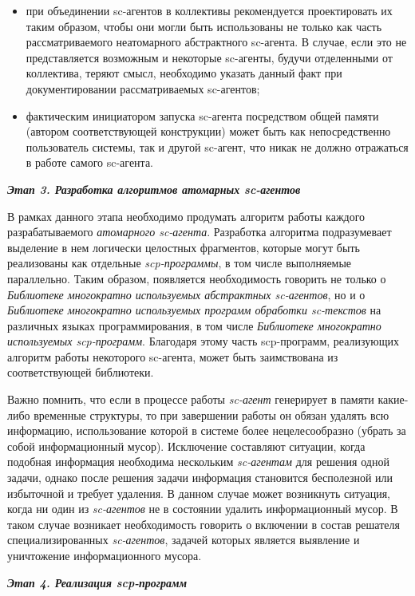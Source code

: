 \begin{itemize}
\item при объединении sc-агентов в коллективы рекомендуется проектировать их таким образом, чтобы они могли быть использованы не только как часть рассматриваемого неатомарного абстрактного sc-агента. В случае, если это не представляется возможным и некоторые sc-агенты, будучи отделенными от коллектива, теряют смысл, необходимо указать данный факт при документировании рассматриваемых sc-агентов;
\item фактическим инициатором запуска sc-агента посредством общей памяти (автором соответствующей конструкции) может быть как непосредственно пользователь системы, так и другой sc-агент, что никак не должно отражаться в работе самого sc-агента.
\end{itemize}

\textbf{\textit{Этап 3. Разработка алгоритмов атомарных sc-агентов}}

В рамках данного этапа необходимо продумать алгоритм работы каждого разрабатываемого \textit{атомарного sc-агента}. Разработка алгоритма подразумевает выделение в нем логически целостных фрагментов, которые могут быть реализованы как отдельные \textit{scp-программы}, в том числе выполняемые параллельно. Таким образом, появляется необходимость говорить не только о \textit{Библиотеке многократно используемых абстрактных sc-агентов}, но и о \textit{Библиотеке многократно используемых программ обработки sc-текстов} на различных языках программирования, в том числе \textit{Библиотеке многократно используемых scp-программ}. Благодаря этому часть scp-программ, реализующих алгоритм работы некоторого sc-агента, может быть заимствована из соответствующей библиотеки.

Важно помнить, что если в процессе работы \textit{sc-агент} генерирует в памяти какие-либо временные структуры, то при завершении работы он обязан удалять всю информацию, использование которой в системе более нецелесообразно (убрать за собой информационный мусор). Исключение составляют ситуации, когда подобная информация необходима нескольким \textit{sc-агентам} для решения одной задачи, однако после решения задачи информация становится бесполезной или избыточной и требует удаления. В данном случае может возникнуть ситуация, когда ни один из \textit{sc-агентов} не в состоянии удалить информационный мусор. В таком случае возникает необходимость говорить о включении в состав решателя специализированных \textit{sc-агентов}, задачей которых является выявление и уничтожение информационного мусора.

\textbf{\textit{Этап 4. Реализация scp-программ}}

